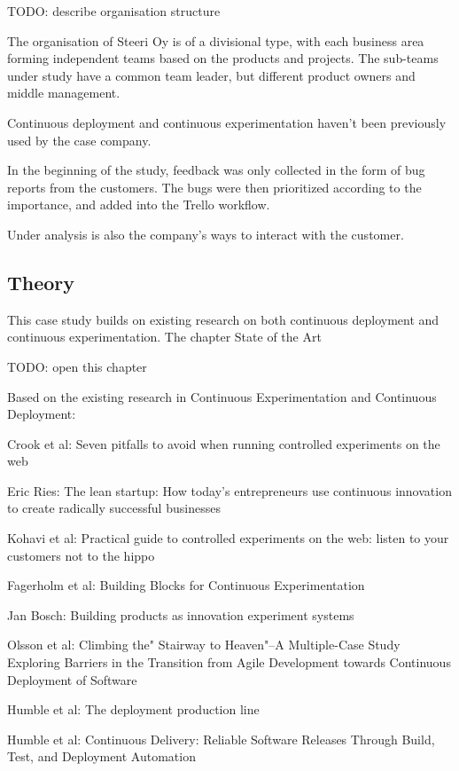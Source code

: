 \documentclass[english]{tktltiki2}
\theoremstyle{definition}
\theoremstyle{remark}
\begin{document}
TODO: describe organisation structure %

The organisation of Steeri Oy is of a divisional type, with each business area forming independent teams based on the products and projects. The sub-teams under study have a common team leader, but different product owners and middle management. 

Continuous deployment and continuous experimentation haven't been previously used by the case company.  

In the beginning of the study, feedback was only collected in the form of bug reports from the customers. The bugs were then prioritized according to the importance, and added into the Trello workflow. 

Under analysis is also the company's ways to interact with the customer.

\subsection{Theory} %

This case study builds on existing research on both continuous deployment and continuous experimentation. The chapter State of the Art 

TODO: open this chapter

Based on the existing research in Continuous Experimentation and Continuous Deployment:

Crook et al: Seven pitfalls to avoid when running controlled experiments on the web

Eric Ries: The lean startup: How today's entrepreneurs use continuous innovation to create radically successful businesses

Kohavi et al: Practical guide to controlled experiments on the web: listen to your customers not to the hippo

Fagerholm et al: Building Blocks for Continuous Experimentation

Jan Bosch: Building products as innovation experiment systems

Olsson et al: Climbing the" Stairway to Heaven"--A Multiple-Case Study Exploring Barriers in the Transition from Agile Development towards Continuous Deployment of Software

Humble et al: The deployment production line

Humble et al: Continuous Delivery: Reliable Software Releases Through Build, Test, and Deployment Automation
\end{document}
